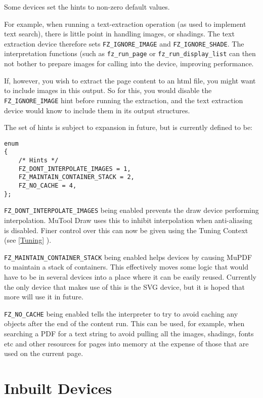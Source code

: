 \documentclass[oneside]{book}
\newcommand{\rjwref}[1] {\autoref{#1} \nameref{#1}}
\begin{document}
Some devices set the hints to non-zero default values.

For example, when running a text-extraction operation (as used to implement text search), there is little point in handling images, or shadings. The text extraction device therefore sets \texttt{FZ\_IGNORE\_IMAGE} and \texttt{FZ\_IGNORE\_SHADE}. The interpretation functions (such as \texttt{fz\_run\_page} or \texttt{fz\_run\_display\_list} can then not bother to prepare images for calling into the device, improving performance.

If, however, you wish to extract the page content to an html file, you might want to include images in this output. So for this, you would disable the \texttt{FZ\_IGNORE\_IMAGE} hint before running the extraction, and the text extraction device would know to include them in its output structures.

The set of hints is subject to expansion in future, but is currently defined to be:

\begin{lstlisting}
enum
{
	/* Hints */
	FZ_DONT_INTERPOLATE_IMAGES = 1,
	FZ_MAINTAIN_CONTAINER_STACK = 2,
	FZ_NO_CACHE = 4,
};
\end{lstlisting}

\texttt{FZ\_DONT\_INTERPOLATE\_IMAGES} being enabled prevents the draw device performing interpolation. MuTool Draw uses this to inhibit interpolation when anti-aliasing is disabled. Finer control over this can now be given using the Tuning Context (see \rjwref{Tuning}).

\texttt{FZ\_MAINTAIN\_CONTAINER\_STACK} being enabled helps devices by causing MuPDF to maintain a stack of containers. This effectively moves some logic that would have to be in several devices into a place where it can be easily reused. Currently the only device that makes use of this is the SVG device, but it is hoped that more will use it in future.

\texttt{FZ\_NO\_CACHE} being enabled tells the interpreter to try to avoid caching any objects after the end of the content run. This can be used, for example, when searching a PDF for a text string to avoid pulling all the images, shadings, fonts etc and other resources for pages into memory at the expense of those that are used on the current page.

\section{Inbuilt Devices}
\end{document}
